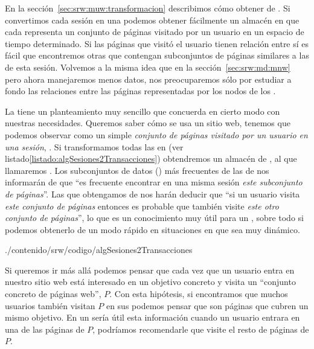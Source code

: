 En la sección~\ref{sec:srw:muw:transformacion} describimos cómo obtener \sns de \flogs. Si convertimos cada sesión en una \transaccion podemos obtener fácilmente un almacén \D en que cada \transaccion representa un conjunto de páginas visitado por un usuario en un espacio de tiempo determinado. Si las páginas que visitó el usuario tienen relación entre sí es fácil que encontremos otras \transacciones que contengan subconjuntos de páginas similares a las de esta sesión. Volvemos a la misma idea que en la sección~\ref{sec:srw:md:mnw} pero ahora manejaremos menos datos, nos preocuparemos sólo por estudiar a fondo las relaciones entre las páginas representadas por los nodos de los \grafos.

La \arm tiene un planteamiento muy sencillo que concuerda en cierto modo con nuestras necesidades. Queremos saber cómo se usa un sitio web, tenemos \sns que podemos observar como un simple \emph{conjunto de páginas visitado por un usuario en una sesión}, \transacciones. Si transformamos todas las \sns en \transacciones (ver listado{\ref{listado:algSesiones2Transacciones}}) obtendremos un almacén de \transacciones, al que llamaremos \D. Los subconjuntos de datos (\itemsets) más frecuentes de las \transacciones de \D nos informarán de que "`es frecuente encontrar en una misma sesión \emph{este subconjunto de páginas}"'. Las \ars que obtengamos de \D nos harán deducir que "`si un usuario visita \emph{este conjunto de páginas} entonces es probable que también visite \emph{este otro conjunto de páginas}"', lo que es un conocimiento muy útil para un \srw, sobre todo si podemos obtenerlo de un modo rápido en situaciones en que \D sea muy dinámico.


                 {./contenido/srw/codigo/algSesiones2Transacciones}

Si queremos ir más allá podemos pensar que cada vez que un usuario entra en nuestro sitio web está interesado en un objetivo concreto y visita un "`conjunto concreto de páginas web"', $P$. Con esta hipótesis, si encontramos que muchos usuarios también visitan $P$ en sus \sns podemos pensar que son páginas que cubren un mismo objetivo. En un \srw sería útil esta información cuando un usuario entrara en una de las páginas de $P$, podríamos recomendarle que visite el resto de páginas de $P$.

